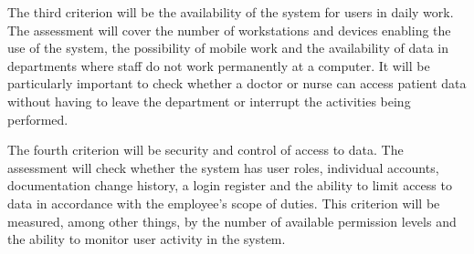 The third criterion will be the availability of the system for users in daily work. The assessment will cover the number of workstations and devices enabling the use of the system, the possibility of mobile work and the availability of data in departments where staff do not work permanently at a computer. It will be particularly important to check whether a doctor or nurse can access patient data without having to leave the department or interrupt the activities being performed.

The fourth criterion will be security and control of access to data. The assessment will check whether the system has user roles, individual accounts, documentation change history, a login register and the ability to limit access to data in accordance with the employee's scope of duties. This criterion will be measured, among other things, by the number of available permission levels and the ability to monitor user activity in the system.
